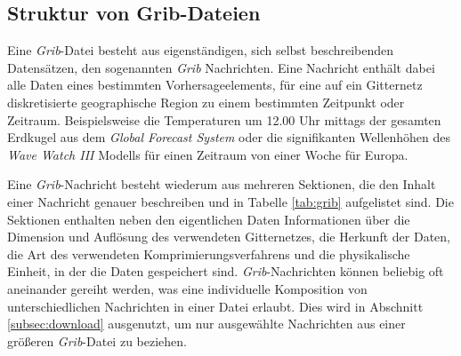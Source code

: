 \subsection{Struktur von Grib-Dateien}
Eine \textit{Grib}-Datei besteht aus eigenständigen, sich selbst
beschreibenden Datensätzen, den sogenannten \textit{Grib}
Nachrichten. Eine Nachricht enthält dabei alle Daten eines bestimmten
Vorhersageelements, für eine auf ein Gitternetz diskretisierte
geographische Region zu einem bestimmten Zeitpunkt oder
Zeitraum. Beispielsweise die Temperaturen um 12.00 Uhr mittags der
gesamten Erdkugel aus dem \textit{Global Forecast System} oder die
signifikanten Wellenhöhen des \textit{Wave Watch III} Modells für
einen Zeitraum von einer Woche für Europa.

Eine \textit{Grib}-Nachricht besteht wiederum aus mehreren Sektionen,
die den Inhalt einer Nachricht genauer beschreiben und in Tabelle
\ref{tab:grib} aufgelistet sind. Die Sektionen enthalten neben den
eigentlichen Daten Informationen über die Dimension und Auflösung des
verwendeten Gitternetzes, die Herkunft der Daten, die Art des
verwendeten Komprimierungsverfahrens und die physikalische Einheit, in
der die Daten gespeichert sind. \textit{Grib}-Nachrichten können
beliebig oft aneinander gereiht werden, was eine individuelle
Komposition von unterschiedlichen Nachrichten in einer Datei
erlaubt. Dies wird in Abschnitt \ref{subsec:download} ausgenutzt, um
nur ausgewählte Nachrichten aus einer größeren \textit{Grib}-Datei zu
beziehen.

